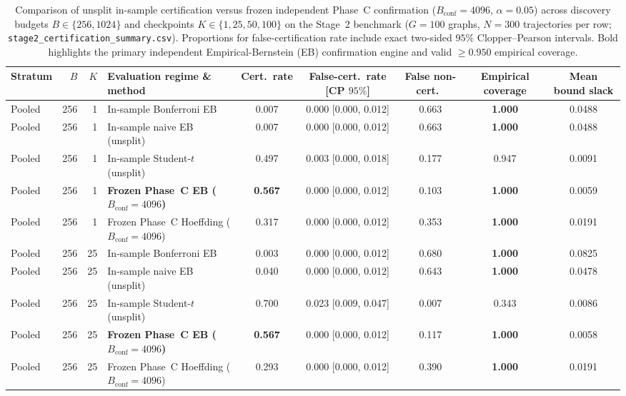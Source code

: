 \begin{table}[htbp]
\caption{Comparison of unsplit in-sample certification versus frozen independent Phase~C confirmation ($B_{\mathrm{conf}}=4096$, $\alpha=0.05$) across discovery budgets $B \in \{256, 1024\}$ and checkpoints $K \in \{1, 25, 50, 100\}$ on the Stage~2 benchmark ($G=100$ graphs, $N=300$ trajectories per row; \texttt{stage2\_certification\_summary.csv}). Proportions for false-certification rate include exact two-sided $95\%$ Clopper--Pearson intervals. Bold highlights the primary independent Empirical-Bernstein (EB) confirmation engine and valid $\ge 0.950$ empirical coverage.}
\label{tab:insample_vs_independent}
\centering
\scriptsize
\begin{tabular}{@{}l r r l c c c c c@{}}
\toprule
Stratum & $B$ & $K$ & Evaluation regime \& method & Cert.\ rate & False-cert.\ rate [CP $95\%$] & False non-cert.\ & Empirical coverage & Mean bound slack \\
\midrule
Pooled & 256 & 1 & In-sample Bonferroni EB & 0.007 & 0.000 [0.000, 0.012] & 0.663 & \textbf{1.000} & 0.0488 \\
Pooled & 256 & 1 & In-sample naive EB (unsplit) & 0.007 & 0.000 [0.000, 0.012] & 0.663 & \textbf{1.000} & 0.0488 \\
Pooled & 256 & 1 & In-sample Student-$t$ (unsplit) & 0.497 & 0.003 [0.000, 0.018] & 0.177 & 0.947 & 0.0091 \\
Pooled & 256 & 1 & \textbf{Frozen Phase~C EB ($B_{\mathrm{conf}}=4096$)} & \textbf{0.567} & 0.000 [0.000, 0.012] & 0.103 & \textbf{1.000} & 0.0059 \\
Pooled & 256 & 1 & Frozen Phase~C Hoeffding ($B_{\mathrm{conf}}=4096$) & 0.317 & 0.000 [0.000, 0.012] & 0.353 & \textbf{1.000} & 0.0191 \\
Pooled & 256 & 25 & In-sample Bonferroni EB & 0.003 & 0.000 [0.000, 0.012] & 0.680 & \textbf{1.000} & 0.0825 \\
Pooled & 256 & 25 & In-sample naive EB (unsplit) & 0.040 & 0.000 [0.000, 0.012] & 0.643 & \textbf{1.000} & 0.0478 \\
Pooled & 256 & 25 & In-sample Student-$t$ (unsplit) & 0.700 & 0.023 [0.009, 0.047] & 0.007 & 0.343 & 0.0086 \\
Pooled & 256 & 25 & \textbf{Frozen Phase~C EB ($B_{\mathrm{conf}}=4096$)} & \textbf{0.567} & 0.000 [0.000, 0.012] & 0.117 & \textbf{1.000} & 0.0058 \\
Pooled & 256 & 25 & Frozen Phase~C Hoeffding ($B_{\mathrm{conf}}=4096$) & 0.293 & 0.000 [0.000, 0.012] & 0.390 & \textbf{1.000} & 0.0191 \\

\end{tabular}
\end{table}
